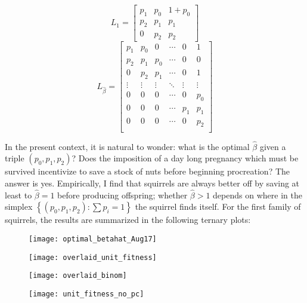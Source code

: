 $$ L_1 =
\begin{bmatrix}
    p_1 & p_0 & 1 + p_0 \\
    p_2 & p_1 & p_1 \\
    0 & p_2 & p_2 
\end{bmatrix}
$$
$$L_{\hat \beta} = 
\begin{bmatrix}
    p_1 & p_0 & 0 & \cdots & 0 & 1 \\
    p_2 & p_1 & p_0 & \cdots & 0 & 0 \\
    0 & p_2 & p_1 & \cdots & 0 & 1 \\
    \vdots & \vdots & \vdots & \ddots & \vdots & \vdots \\
    0 & 0 & 0 & \cdots & 0 & p_0 \\
    0 & 0 & 0 & \cdots & p_1 & p_1  \\
    0 & 0 & 0 & \cdots & 0 & p_2 \\
\end{bmatrix}
$$

In the present context, it is natural to wonder: what is the optimal $\hat \beta$ given a triple $(p_0, p_1, p_2)$? Does the imposition of a 
day long pregnancy which must be survived incentivize to save a stock of nuts before beginning procreation? The answer is yes. Empirically,
I find that squirrels are always better off by saving at least to $\hat \beta = 1$ before producing offspring; whether $\hat \beta > 1$ depends
on where in the simplex $\left\{ \left( p_0, p_1, p_2 \right): \sum p_i = 1 \right\}$ the squirrel finds itself. For the first family of squirrels,
the results are summarized in the following ternary plots:

\begin{figure}[H]
    \centering
    \texttt{[image: optimal\_betahat\_Aug17]} \\
\end{figure}
\begin{figure}[H]
    \centering
    \texttt{[image: overlaid\_unit\_fitness]} \\
\end{figure}
\begin{figure}[H]
    \centering
    \texttt{[image: overlaid\_binom]} \\
\end{figure}
\begin{figure}[H]
    \centering
    \texttt{[image: unit\_fitness\_no\_pc]} \\
\end{figure}


